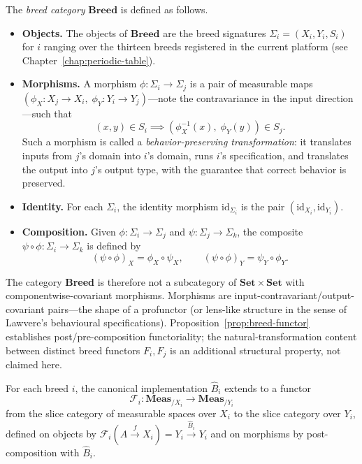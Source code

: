 \begin{definition}
\label{def:breed-category}
The \emph{breed category} $\mathbf{Breed}$ is defined as follows.
\begin{itemize}
  \item \textbf{Objects.}  The objects of $\mathbf{Breed}$ are the breed signatures
    $\Sigma_i = (X_i, Y_i, S_i)$ for $i$ ranging over the thirteen breeds
    registered in the current platform (see Chapter~\ref{chap:periodic-table}).
  \item \textbf{Morphisms.}  A morphism $\phi : \Sigma_i \to \Sigma_j$ is a pair of
    measurable maps $(\phi_X : X_j \to X_i,\; \phi_Y : Y_i \to Y_j)$---note the
    contravariance in the input direction---such that
    \[
      (x, y) \in S_i \implies (\phi_X^{-1}(x),\; \phi_Y(y)) \in S_j.
    \]
    Such a morphism is called a \emph{behavior-preserving transformation}: it
    translates inputs from $j$'s domain into $i$'s domain, runs $i$'s specification,
    and translates the output into $j$'s output type, with the guarantee that correct
    behavior is preserved.
  \item \textbf{Identity.}  For each $\Sigma_i$, the identity morphism
    $\mathrm{id}_{\Sigma_i}$ is the pair $(\mathrm{id}_{X_i}, \mathrm{id}_{Y_i})$.
  \item \textbf{Composition.}  Given $\phi : \Sigma_i \to \Sigma_j$ and
    $\psi : \Sigma_j \to \Sigma_k$, the composite $\psi \circ \phi : \Sigma_i \to
    \Sigma_k$ is defined by
    \[
      (\psi \circ \phi)_X = \phi_X \circ \psi_X, \qquad
      (\psi \circ \phi)_Y = \psi_Y \circ \phi_Y.
    \]
\end{itemize}
\end{definition}

\begin{remark}
The category \textbf{Breed} is therefore not a subcategory of $\mathbf{Set} \times \mathbf{Set}$ with componentwise-covariant morphisms. Morphisms are input-contravariant/output-covariant pairs---the shape of a profunctor (or lens-like structure in the sense of Lawvere's behavioural specifications). Proposition~\ref{prop:breed-functor} establishes post/pre-composition functoriality; the natural-transformation content between distinct breed functors $F_i, F_j$ is an additional structural property, not claimed here.
\end{remark}

\begin{proposition}
\label{prop:breed-functor}
For each breed $i$, the canonical implementation $\hat{B}_i$ extends to a functor
\[
  \mathcal{F}_i : \mathbf{Meas}_{/X_i} \longrightarrow \mathbf{Meas}_{/Y_i}
\]
from the slice category of measurable spaces over $X_i$ to the slice category over
$Y_i$, defined on objects by $\mathcal{F}_i(A \xrightarrow{f} X_i) = Y_i
\xrightarrow{\hat{B}_i} Y_i$ and on morphisms by post-composition with $\hat{B}_i$.
\end{proposition}

